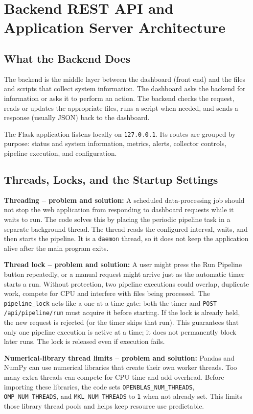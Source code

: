 \section{Backend REST API and Application Server Architecture}
\label{sec:backend_server}

\subsection{What the Backend Does}
The backend is the middle layer between the dashboard (front end) and the files and scripts that collect system information. The dashboard asks the backend for information or asks it to perform an action. The backend checks the request, reads or updates the appropriate files, runs a script when needed, and sends a response (usually JSON) back to the dashboard.

The Flask application listens locally on \texttt{127.0.0.1}. Its routes are grouped by purpose: status and system information, metrics, alerts, collector controls, pipeline execution, and configuration.

\subsection{Threads, Locks, and the Startup Settings}
\textbf{Threading -- problem and solution:} A scheduled data-processing job should not stop the web application from responding to dashboard requests while it waits to run. The code solves this by placing the periodic pipeline task in a separate background thread. The thread reads the configured interval, waits, and then starts the pipeline. It is a \texttt{daemon} thread, so it does not keep the application alive after the main program exits.

\textbf{Thread lock -- problem and solution:} A user might press the Run Pipeline button repeatedly, or a manual request might arrive just as the automatic timer starts a run. Without protection, two pipeline executions could overlap, duplicate work, compete for CPU and interfere with files being processed. The \texttt{pipeline\_lock} acts like a one-at-a-time gate: both the timer and \texttt{POST /api/pipeline/run} must acquire it before starting. If the lock is already held, the new request is rejected (or the timer skips that run). This guarantees that only one pipeline execution is active at a time; it does not permanently block later runs. The lock is released even if execution fails.

\textbf{Numerical-library thread limits -- problem and solution:} Pandas and NumPy can use numerical libraries that create their own worker threads. Too many extra threads can compete for CPU time and add overhead. Before importing these libraries, the code sets \texttt{OPENBLAS\_NUM\_THREADS}, \texttt{OMP\_NUM\_THREADS}, and \texttt{MKL\_NUM\_THREADS} to \texttt{1} when not already set. This limits those library thread pools and helps keep resource use predictable.

